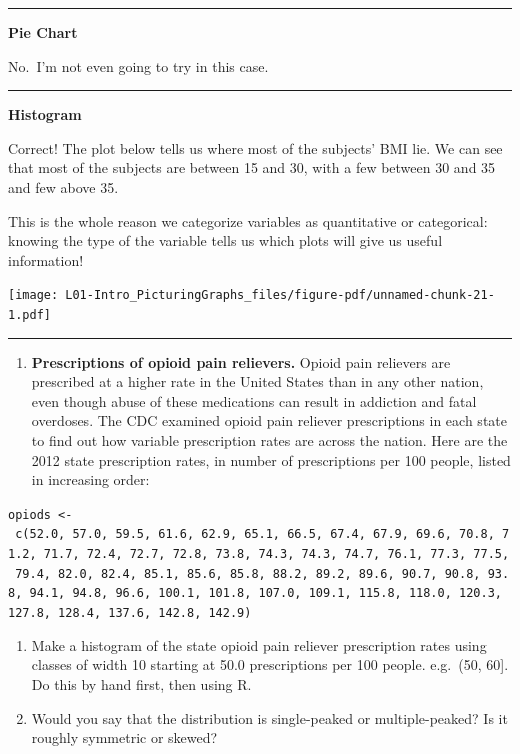 \documentclass[
  letterpaper,
  DIV=11,
  numbers=noendperiod,
  oneside]{scrreprt}
\providecommand{\tightlist}{%
  \setlength{\itemsep}{0pt}\setlength{\parskip}{0pt}}\usepackage{longtable,booktabs,array}
\begin{document}
\begin{center}\rule{0.5\linewidth}{0.5pt}\end{center}

\textbf{Pie Chart}

No.~I'm not even going to try in this case.

\begin{center}\rule{0.5\linewidth}{0.5pt}\end{center}

\textbf{Histogram}

Correct! The plot below tells us where most of the subjects' BMI lie. We
can see that most of the subjects are between 15 and 30, with a few
between 30 and 35 and few above 35.

This is the whole reason we categorize variables as quantitative or
categorical: knowing the type of the variable tells us which plots will
give us useful information!

\texttt{[image: L01-Intro\_PicturingGraphs\_files/figure-pdf/unnamed-chunk-21-1.pdf]}

\begin{center}\rule{0.5\linewidth}{0.5pt}\end{center}

\begin{enumerate}
\def\labelenumi{\arabic{enumi}.}
\setcounter{enumi}{1}
\tightlist
\item
  \textbf{Prescriptions of opioid pain relievers.} Opioid pain relievers
  are prescribed at a higher rate in the United States than in any other
  nation, even though abuse of these medications can result in addiction
  and fatal overdoses. The CDC examined opioid pain reliever
  prescriptions in each state to find out how variable prescription
  rates are across the nation. Here are the 2012 state prescription
  rates, in number of prescriptions per 100 people, listed in increasing
  order:
\end{enumerate}

\texttt{opiods\ \textless{}-\ c(52.0,\ 57.0,\ 59.5,\ 61.6,\ 62.9,\ 65.1,\ 66.5,\ 67.4,\ 67.9,\ 69.6,\ 70.8,\ 71.2,\ 71.7,\ 72.4,\ 72.7,\ 72.8,\ 73.8,\ 74.3,\ 74.3,\ 74.7,\ 76.1,\ 77.3,\ 77.5,\ 79.4,\ 82.0,\ 82.4,\ 85.1,\ 85.6,\ 85.8,\ 88.2,\ 89.2,\ 89.6,\ 90.7,\ 90.8,\ 93.8,\ 94.1,\ 94.8,\ 96.6,\ 100.1,\ 101.8,\ 107.0,\ 109.1,\ 115.8,\ 118.0,\ 120.3,\ 127.8,\ 128.4,\ 137.6,\ 142.8,\ 142.9)}

\begin{enumerate}
\def\labelenumi{\alph{enumi}.}
\tightlist
\item
  Make a histogram of the state opioid pain reliever prescription rates
  using classes of width 10 starting at 50.0 prescriptions per 100
  people. e.g.~(50, 60{]}. Do this by hand first, then using R.
\item
  Would you say that the distribution is single-peaked or
  multiple-peaked? Is it roughly symmetric or skewed?
\end{enumerate}
\end{document}
